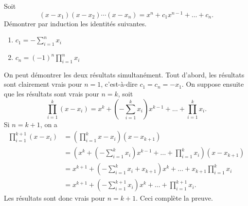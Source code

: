 \begin{exercice}
  Soit
  \begin{displaymath}
    (x - x_1)(x - x_2) \cdots (x - x_n) = x^n + c_1 x^{n - 1} + \dots + c_n.
  \end{displaymath}
  Démontrer par induction les identités suivantes.
  \begin{enumerate}
  \item $c_1 = - \sum_{i=1}^n x_i$
  \item $c_n = (-1)^n \prod_{i=1}^n x_i$
  \end{enumerate}
  \begin{sol}
    On peut démontrer les deux résultats simultanément.  Tout d'abord,
    les résultats sont clairement vrais pour $n = 1$, c'est-à-dire
    $c_1 = c_n = - x_1$. On suppose ensuite que les résultats sont
    vrais pour $n = k$, soit
    \begin{displaymath}
      \prod_{i = 1}^k (x - x_i) =
      x^k + \left(- \sum_{i = 1}^k x_i \right) x^{k - 1} + \dots +
      \prod_{i = 1}^k x_i.
    \end{displaymath}
    Si $n = k + 1$, on a
    \begin{align*}
      \prod_{i = 1}^{k + 1} (x - x_i)
      &=
      \left(
        \prod_{i = 1}^k x - x_i
      \right)
      (x - x_{k + 1}) \\
      &=
      \left(
        x^k + \left(- \sum_{i = 1}^k x_i \right) x^{k - 1} + \dots +
        \prod_{i = 1}^k x_i
      \right)
      (x - x_{k + 1}) \\
      &= x^{k + 1} + \left( - \sum_{i = 1}^k x_i + x_{k + 1} \right)
      x^k + \dots + x_{k + 1} \prod_{i = 1}^k x_i \\
      &= x^{k + 1} + \left( - \sum_{i = 1}^{k + 1} x_i \right) x^k +
      \dots + \prod_{i = 1}^{k + 1} x_i.
    \end{align*}
    Les résultats sont donc vrais pour $n = k + 1$. Ceci complète la
    preuve.
  \end{sol}
\end{exercice}

